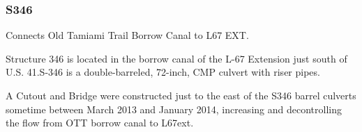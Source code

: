 %
%


\clearpage
\subsubsection{S346}
Connects Old Tamiami Trail Borrow Canal to L67 EXT.

Structure 346 is located in the borrow canal of the L-67 Extension just south of U.S. 41.S-346 is a double-barreled, 72-inch, CMP culvert with riser pipes.

A Cutout and Bridge were constructed just to the east of the S346 barrel culverts sometime between March 2013 and January 2014, increasing and decontrolling the flow from OTT borrow canal to L67ext.

